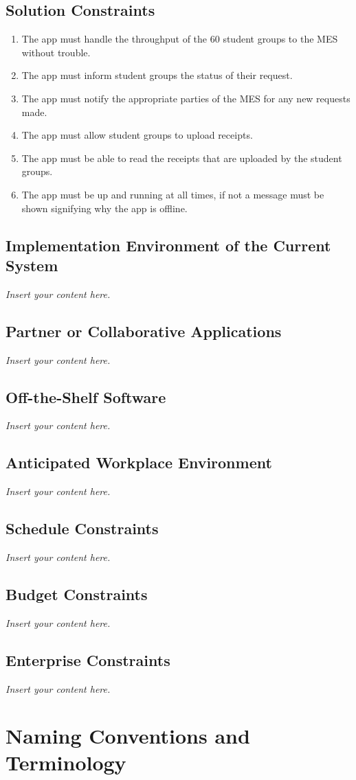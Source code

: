 \documentclass[12pt]{article}
\newcommand{\lips}{\textit{Insert your content here.}}
\begin{document}
\subsection{Solution Constraints}
\begin{enumerate}
  \item The app must handle the throughput of the 60 student groups to the MES without trouble.
  \item The app must inform student groups the status of their request. 
  \item The app must notify the appropriate parties of the MES for any new requests made.
  \item The app must allow student groups to upload receipts. 
  \item The app must be able to read the receipts that are uploaded by the student groups. 
  \item The app must be up and running at all times, if not a message must be shown signifying why the app is offline. 
\end{enumerate}
\subsection{Implementation Environment of the Current System}
\lips
\subsection{Partner or Collaborative Applications}
\lips
\subsection{Off-the-Shelf Software}
\lips
\subsection{Anticipated Workplace Environment}
\lips
\subsection{Schedule Constraints}
\lips
\subsection{Budget Constraints}
\lips
\subsection{Enterprise Constraints}
\lips

\section{Naming Conventions and Terminology}
\end{document}
